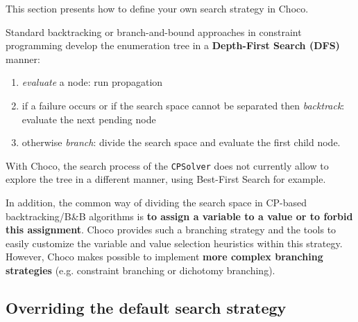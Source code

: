 This section presents how to define your own search strategy in Choco. 
\begin{note}
  Standard backtracking or branch-and-bound approaches in constraint programming develop the enumeration tree in a \textbf{Depth-First Search (DFS)} manner:
  \begin{enumerate}
  \item \emph{evaluate} a node: run propagation 
  \item if a failure occurs or if the search space cannot be separated then \emph{backtrack}: evaluate the next pending node
  \item otherwise \emph{branch}: divide the search space and evaluate the first child node.
  \end{enumerate}
  With Choco, the search process of the \texttt{CPSolver} does not currently allow to explore the tree in a different manner, using Best-First Search for example. 

  In addition, the common way of dividing the search space in CP-based backtracking/B\&B algorithms is \textbf{to assign a variable to a value or to forbid this assignment}. Choco provides such a branching strategy and the tools to easily customize the variable and value selection heuristics within this strategy. However, Choco makes possible to implement \textbf{more complex branching strategies} (e.g. constraint branching or dichotomy branching).
\end{note}


\subsection{Overriding the default search strategy}\label{solver:overridethedefaultsearchstrategy}\hypertarget{solver:overridethedefaultsearchstrategy}{}



